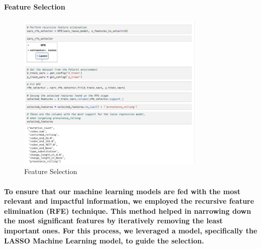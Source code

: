 \documentclass{article}
\begin{document}
\paragraph{\textbf{}}
\paragraph{\textbf{Feature Selection}}
\paragraph{\textbf{}}
\begin{figure}[h]
    \centering
    \includegraphics[width=0.8\textwidth]{feature_selection.png} 
    \caption{Feature Selection}
    \label{fig:my_label_4}
\end{figure}
\paragraph{\textbf{}}
\paragraph{To ensure that our machine learning models are fed with the most relevant and impactful information, we employed the recursive feature elimination (RFE) technique. This method helped in narrowing down the most significant features by iteratively removing the least important ones. For this process, we leveraged a model, specifically the LASSO Machine Learning model, to guide the selection.}
\end{document}
